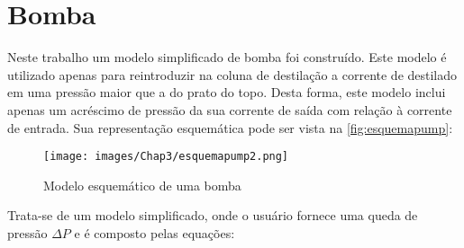 
\section{Bomba} \label{sec:modelobomba}
Neste trabalho um modelo simplificado de bomba foi construído.
Este modelo é utilizado apenas para reintroduzir na coluna de destilação a corrente de destilado em uma pressão maior
que a do prato do topo. Desta forma, este modelo inclui apenas um acréscimo de pressão da sua corrente de saída com
relação à corrente de entrada.
Sua representação esquemática pode ser vista na \autoref{fig:esquemapump}:

\begin{figure}[htb]
\centering \texttt{[image: images/Chap3/esquemapump2.png]}
\caption{Modelo esquemático de uma bomba}
\label{fig:esquemapump}
\end{figure}

Trata-se de um modelo simplificado, onde o usuário fornece uma queda de pressão $\Delta P$ e é composto pelas equações:

